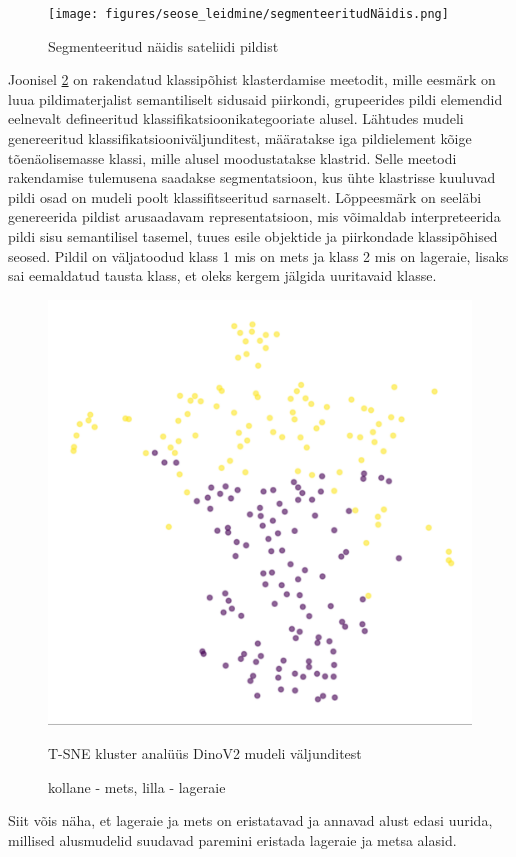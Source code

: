 \begin{figure}[H]
    \centering
    \texttt{[image: figures/seose\_leidmine/segmenteeritudNäidis.png]}
    \caption{Segmenteeritud näidis sateliidi pildist}
    \label{fig:segmenteeritudPealiskiht}
\end{figure}

Joonisel \ref{fig:tsneDinoPatchEmbedings} on rakendatud klassipõhist klasterdamise meetodit, mille eesmärk on luua
pildimaterjalist semantiliselt sidusaid piirkondi, grupeerides pildi elemendid
eelnevalt defineeritud klassifikatsioonikategooriate alusel. Lähtudes mudeli
genereeritud klassifikatsiooniväljunditest, määratakse iga pildielement kõige
tõenäolisemasse klassi, mille alusel moodustatakse klastrid. Selle meetodi
rakendamise tulemusena saadakse segmentatsioon, kus ühte klastrisse kuuluvad
pildi osad on mudeli poolt klassifitseeritud sarnaselt. Lõppeesmärk on seeläbi
genereerida pildist arusaadavam representatsioon, mis
võimaldab interpreteerida pildi sisu semantilisel tasemel, tuues
esile objektide ja piirkondade klassipõhised seosed. Pildil on väljatoodud klass 1 mis on mets ja klass 2 mis on lageraie, lisaks sai eemaldatud tausta klass, et oleks kergem jälgida uuritavaid klasse.

\begin{figure}[H]
    \centering
    \includegraphics[width=.7\textwidth]{figures/seose_leidmine/tsneDinoPatchEmbedings.png}
    \caption{T-SNE kluster analüüs DinoV2 mudeli väljunditest}
    \caption*{kollane - mets, lilla - lageraie}
    \label{fig:tsneDinoPatchEmbedings}
\end{figure}

Siit võis näha, et lageraie ja mets on eristatavad ja annavad alust edasi uurida, millised alusmudelid suudavad paremini eristada lageraie ja metsa alasid.
